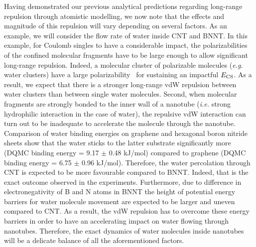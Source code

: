 \documentclass[aps,prl,groupaddress, twocolumn]{revtex4-1}  %
\begin{document}
Having demonstrated our previous analytical predictions regarding long-range repulsion through atomistic modelling, we now note that the effects and magnitude of this repulsion will vary depending on several factors. As an example, we will consider the flow rate of water inside CNT and BNNT\@. In this example, for Coulomb singles to have a considerable impact, the polarizabilities of the confined molecular fragments have to be large enough to allow significant long-range repulsion. Indeed, a molecular cluster of polarizable molecules (\textit{e.g.} water clusters) have a large polarizability~\cite{hammond_2009} for sustaining an impactful $E_{\rm CS}$. As a result, we expect that there is a stronger long-range vdW repulsion between water clusters than between single water molecules. Second, when molecular fragments are strongly bonded to the inner wall of a nanotube (\textit{i.e.} strong hydrophilic interaction in the case of water), the repulsive vdW interaction can turn out to be inadequate to accelerate the molecule through the nanotube. Comparison of water binding energies on graphene and hexagonal boron nitride sheets show that the water sticks to the latter substrate significantly more (DQMC binding energy = 9.17 $\pm$ 0.48 kJ/mol) compared to graphene (DQMC binding energy = 6.75 $\pm$ 0.96 kJ/mol)\cite{Al-Hamdani_CNT_2017, Al-Hamdani_BNNT_2017}. Therefore, the water percolation through CNT is expected to be more favourable compared to BNNT\@. Indeed, that is the exact outcome observed in the experiments\cite{secchi2016massive}. Furthermore, due to difference in electronegativity of B and N atoms in BNNT the height of potential energy barriers for water molecule movement are expected to be larger and uneven compared to CNT\@. As a result, the vdW repulsion has to overcome these energy barriers in order to have an accelerating impact on water flowing through nanotubes. Therefore, the exact dynamics of water molecules inside nanotubes will be a delicate balance of all the aforementioned factors.\\ 
\end{document}
